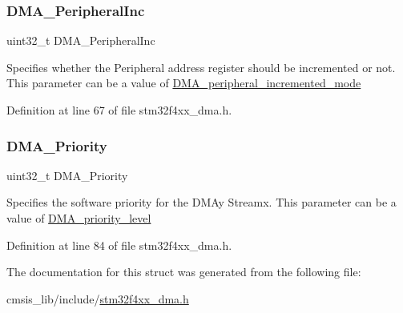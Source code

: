 \subsubsection{\texorpdfstring{D\+M\+A\+\_\+\+Peripheral\+Inc}{DMA\_PeripheralInc}}
{\footnotesize\ttfamily uint32\+\_\+t D\+M\+A\+\_\+\+Peripheral\+Inc}

Specifies whether the Peripheral address register should be incremented or not. This parameter can be a value of \hyperlink{group___d_m_a__peripheral__incremented__mode}{D\+M\+A\+\_\+peripheral\+\_\+incremented\+\_\+mode} 

Definition at line 67 of file stm32f4xx\+\_\+dma.\+h.

\mbox{\label{struct_d_m_a___init_type_def_aabb62e3f5536fc15a201058a1b6bda18}} 
\subsubsection{\texorpdfstring{D\+M\+A\+\_\+\+Priority}{DMA\_Priority}}
{\footnotesize\ttfamily uint32\+\_\+t D\+M\+A\+\_\+\+Priority}

Specifies the software priority for the D\+M\+Ay Streamx. This parameter can be a value of \hyperlink{group___d_m_a__priority__level}{D\+M\+A\+\_\+priority\+\_\+level} 

Definition at line 84 of file stm32f4xx\+\_\+dma.\+h.



The documentation for this struct was generated from the following file\+:\begin{DoxyCompactItemize}
\item 
cmsis\+\_\+lib/include/\hyperlink{stm32f4xx__dma_8h}{stm32f4xx\+\_\+dma.\+h}\end{DoxyCompactItemize}
